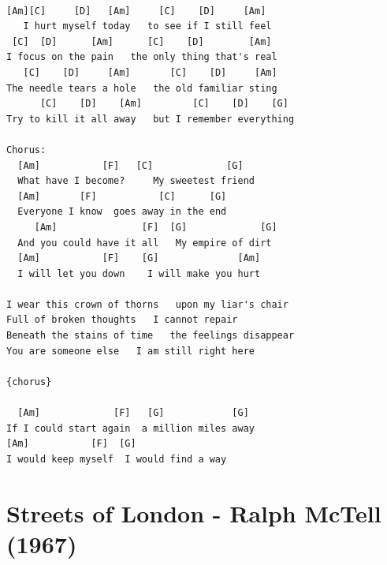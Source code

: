 \documentclass[
]{book}
\let\stdsection\section
\renewcommand\section{\clearpage\stdsection}
\begin{document}
\begin{verbatim}

[Am][C]     [D]   [Am]     [C]    [D]     [Am]
   I hurt myself today   to see if I still feel
 [C]  [D]      [Am]      [C]    [D]        [Am]
I focus on the pain   the only thing that's real
   [C]    [D]     [Am]       [C]    [D]     [Am]
The needle tears a hole   the old familiar sting
      [C]    [D]    [Am]         [C]    [D]    [G]         
Try to kill it all away   but I remember everything

Chorus:
  [Am]           [F]   [C]             [G]
  What have I become?     My sweetest friend
  [Am]       [F]           [C]      [G]
  Everyone I know  goes away in the end
     [Am]               [F]  [G]             [G]
  And you could have it all   My empire of dirt
  [Am]           [F]    [G]              [Am]
  I will let you down    I will make you hurt

I wear this crown of thorns   upon my liar's chair
Full of broken thoughts   I cannot repair
Beneath the stains of time   the feelings disappear
You are someone else   I am still right here

{chorus}

  [Am]             [F]   [G]            [G]
If I could start again  a million miles away
[Am]           [F]  [G]
I would keep myself  I would find a way
\end{verbatim}

\hypertarget{streets-of-london---ralph-mctell-1967}{%
\section{Streets of London - Ralph McTell (1967)}\label{streets-of-london---ralph-mctell-1967}}
\end{document}
